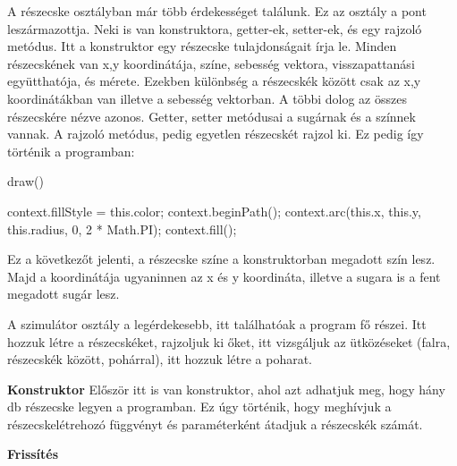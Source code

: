 
A részecske osztályban már több érdekességet találunk. Ez az osztály a pont leszármazottja. Neki is van konstruktora, getter-ek, setter-ek, és egy rajzoló metódus. Itt a konstruktor egy részecske tulajdonságait írja le. Minden részecskének van x,y koordinátája, színe, sebesség vektora, visszapattanási együtthatója, és mérete. Ezekben különbség a részecskék között csak az x,y koordinátákban van illetve a sebesség vektorban. A többi dolog az összes részecskére nézve azonos. Getter, setter metódusai a sugárnak és a színnek vannak. A rajzoló metódus, pedig egyetlen részecskét rajzol ki. Ez pedig így történik a programban: 
\begin{java}
	draw()
	{
		
		context.fillStyle = this.color;
		context.beginPath();
		context.arc(this.x, this.y, this.radius, 
		0, 2 * Math.PI);
		context.fill();
	}
\end{java}
Ez a következőt jelenti, a részecske színe a konstruktorban megadott szín lesz. Majd a koordinátája ugyaninnen az x és y koordináta, illetve a sugara is a fent megadott sugár lesz. 


A szimulátor osztály a legérdekesebb, itt találhatóak a program fő részei. Itt hozzuk létre a részecskéket, rajzoljuk ki őket, itt vizsgáljuk az ütközéseket (falra, részecskék között, pohárral), itt hozzuk létre a poharat. 

\textbf{Konstruktor}
Először itt is van konstruktor, ahol azt adhatjuk meg, hogy hány db részecske legyen a programban. Ez úgy történik, hogy meghívjuk a részecskelétrehozó függvényt és paraméterként átadjuk a részecskék számát.

\textbf{Frissítés}

